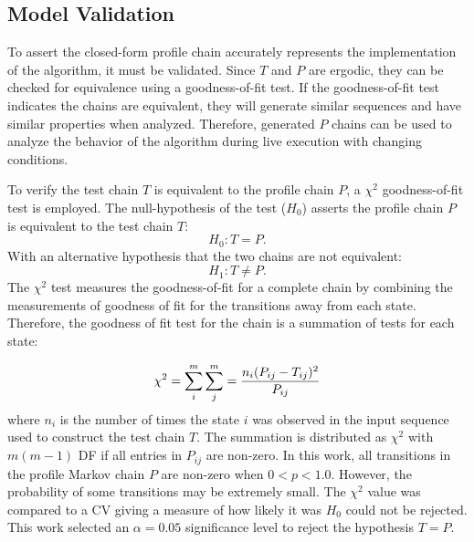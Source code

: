 \subsection{Model Validation}


To assert the closed-form profile chain accurately represents the implementation of the algorithm, it must be validated.
Since $T$ and $P$ are ergodic, they can be checked for equivalence using a goodness-of-fit test.
If the goodness-of-fit test indicates the chains are equivalent, they will generate similar sequences and have similar properties when analyzed.
Therefore, generated $P$ chains can be used to analyze the behavior of the algorithm during live execution with changing conditions.

To verify the test chain $T$ is equivalent to the profile chain $P$, a $\chi^2$ goodness-of-fit test is employed.
The null-hypothesis of the test ($H_{0}$) asserts the profile chain $P$ is equivalent to the test chain $T$:
\begin{equation} H_{0}: T = P.\end{equation}
With an alternative hypothesis that the two chains are not equivalent:
\begin{equation} H_{1}: T \neq P.\end{equation}
The $\chi^2$ test measures the goodness-of-fit for a complete chain by combining the measurements of goodness of fit for the transitions away from each state.
Therefore, the goodness of fit test for the chain is a summation of tests for each state:\cite{MARKOV3}

\begin{equation}
    \chi^2 = \sum_{i}^{m} \sum_{j}^{m} = \frac{n_{i}(P_{ij}-T_{ij})^2}{P_{ij}}
    \vspace{12pt}
\end{equation}%
where $n_{i}$ is the number of times the state $i$ was observed in the input sequence used to construct the test chain $T$.
The summation is distributed as $\chi^2$ with $m(m-1)$ \ac{DF} if all entries in $P_{ij}$ are non-zero.
In this work, all transitions in the profile Markov chain $P$ are non-zero when $0<p<1.0$.
However, the probability of some transitions may be extremely small.
The $\chi^2$ value was compared to a \ac{CV} giving a measure of how likely it was $H_{0}$ could not be rejected.
This work selected an $\alpha = 0.05$ significance level to reject the hypothesis $T=P$.

